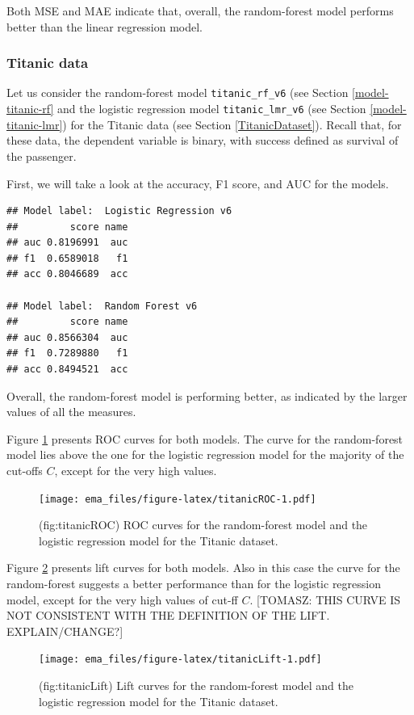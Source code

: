 \documentclass[12pt,]{krantz}
\begin{document}
Both MSE and MAE indicate that, overall, the random-forest model performs better than the linear regression model.

\hypertarget{modelPerformanceTitanic}{%
\subsubsection{Titanic data}\label{modelPerformanceTitanic}}

Let us consider the random-forest model \texttt{titanic\_rf\_v6} (see Section \ref{model-titanic-rf} and the logistic regression model \texttt{titanic\_lmr\_v6} (see Section \ref{model-titanic-lmr}) for the Titanic data (see Section \ref{TitanicDataset}). Recall that, for these data, the dependent variable is binary, with success defined as survival of the passenger.

First, we will take a look at the accuracy, F1 score, and AUC for the models.

\begin{verbatim}
## Model label:  Logistic Regression v6 
##         score name
## auc 0.8196991  auc
## f1  0.6589018   f1
## acc 0.8046689  acc

## Model label:  Random Forest v6 
##         score name
## auc 0.8566304  auc
## f1  0.7289880   f1
## acc 0.8494521  acc
\end{verbatim}

Overall, the random-forest model is performing better, as indicated by the larger values of all the measures.

Figure \ref{fig:titanicROC} presents ROC curves for both models. The curve for the random-forest model lies above the one for the logistic regression model for the majority of the cut-offs \(C\), except for the very high values.

\begin{figure}
\centering
\texttt{[image: ema\_files/figure-latex/titanicROC-1.pdf]}
\caption{\label{fig:titanicROC}(fig:titanicROC) ROC curves for the random-forest model and the logistic regression model for the Titanic dataset.}
\end{figure}

Figure \ref{fig:titanicLift} presents lift curves for both models. Also in this case the curve for the random-forest suggests a better performance than for the logistic regression model, except for the very high values of cut-ff \(C\). {[}TOMASZ: THIS CURVE IS NOT CONSISTENT WITH THE DEFINITION OF THE LIFT. EXPLAIN/CHANGE?{]}

\begin{figure}
\centering
\texttt{[image: ema\_files/figure-latex/titanicLift-1.pdf]}
\caption{\label{fig:titanicLift}(fig:titanicLift) Lift curves for the random-forest model and the logistic regression model for the Titanic dataset.}
\end{figure}
\end{document}
